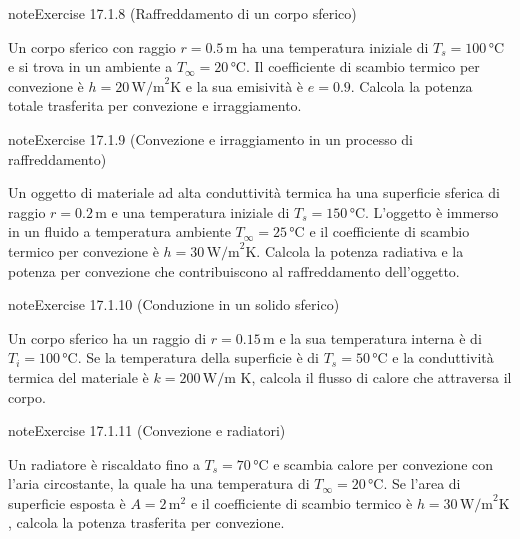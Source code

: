 \documentclass[letterpaper,10pt,italian]{jupyterBook}
\begin{document}
\begin{sphinxadmonition}{note}{Exercise 17.1.8 (Raffreddamento di un corpo sferico)}



\sphinxAtStartPar
Un corpo sferico con raggio \(r = 0.5 \, \text{m}\) ha una temperatura iniziale di \(T_s = 100 \, \text{°C}\) e si trova in un ambiente a \(T_\infty = 20 \, \text{°C}\). Il coefficiente di scambio termico per convezione è \(h = 20 \, \text{W/m}^2\text{K}\) e la sua emisività è \(e = 0.9\). Calcola la potenza totale trasferita per convezione e irraggiamento.
\end{sphinxadmonition}
 \label{exercise:ch/thermodynamics/heat-transmission-problems-exercise-8}

\begin{sphinxadmonition}{note}{Exercise 17.1.9 (Convezione e irraggiamento in un processo di raffreddamento)}



\sphinxAtStartPar
Un oggetto di materiale ad alta conduttività termica ha una superficie sferica di raggio \(r = 0.2 \, \text{m}\) e una temperatura iniziale di \(T_s = 150 \, \text{°C}\). L’oggetto è immerso in un fluido a temperatura ambiente \(T_\infty = 25 \, \text{°C}\) e il coefficiente di scambio termico per convezione è \(h = 30 \, \text{W/m}^2\text{K}\). Calcola la potenza radiativa e la potenza per convezione che contribuiscono al raffreddamento dell’oggetto.
\end{sphinxadmonition}
 \label{exercise:ch/thermodynamics/heat-transmission-problems-exercise-9}

\begin{sphinxadmonition}{note}{Exercise 17.1.10 (Conduzione in un solido sferico)}



\sphinxAtStartPar
Un corpo sferico ha un raggio di \(r = 0.15 \, \text{m}\) e la sua temperatura interna è di \(T_i = 100 \, \text{°C}\). Se la temperatura della superficie è di \(T_s = 50 \, \text{°C}\) e la conduttività termica del materiale è \(k = 200 \, \text{W/m K}\), calcola il flusso di calore che attraversa il corpo.
\end{sphinxadmonition}
 \label{exercise:ch/thermodynamics/heat-transmission-problems-exercise-10}

\begin{sphinxadmonition}{note}{Exercise 17.1.11 (Convezione e radiatori)}



\sphinxAtStartPar
Un radiatore è riscaldato fino a \(T_s = 70 \, \text{°C}\) e scambia calore per convezione con l’aria circostante, la quale ha una temperatura di \(T_\infty = 20 \, \text{°C}\). Se l’area di superficie esposta è \(A = 2 \, \text{m}^2\) e il coefficiente di scambio termico è \(h = 30 \, \text{W/m}^2\text{K}\), calcola la potenza trasferita per convezione.
\end{sphinxadmonition}
 \label{exercise:ch/thermodynamics/heat-transmission-problems-exercise-11}
\end{document}
